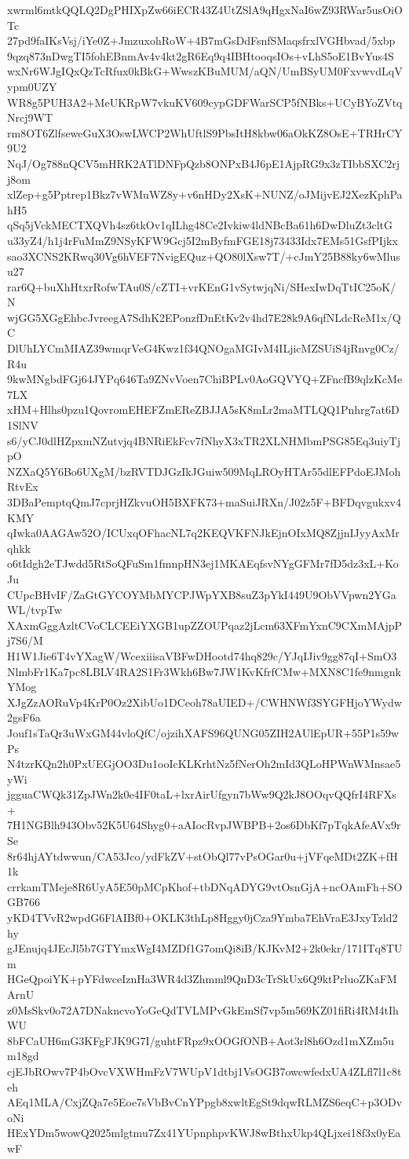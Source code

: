 xwrml6mtkQQLQ2DgPHIXpZw66iECR43Z4UtZSlA9qHgxNaI6wZ93RWar5usOiOTc
27pd9faIKsVsj/iYe0Z+JmzuxohRoW+4B7mGsDdFsnfSMaqsfrxlVGHbvad/5xbp
9qzq873nDwgTI5fohEBnmAv4v4kt2gR6Eq9q4IBHtooqsIOs+vLhS5oE1BvYus4S
wxNr6WJgIQxQzTcRfux0kBkG+WwszKBuMUM/aQN/UmBSyUM0FxvwvdLqVypm0UZY
WR8g5PUH3A2+MeUKRpW7vkuKV609cypGDFWarSCP5fNBks+UCyBYoZVtqNrcj9WT
rm8OT6ZlfseweGuX3OswLWCP2WhUftlS9PbsItH8kbw06aOkKZ8OsE+TRHrCY9U2
NqJ/Og788nQCV5mHRK2ATlDNFpQzb8ONPxB4J6pE1AjpRG9x3zTIbbSXC2rjj8om
xlZep+g5Pptrep1Bkz7vWMuWZ8y+v6nHDy2XsK+NUNZ/oJMijvEJ2XezKphPahH5
qSq5jVckMECTXQVh4sz6tkOv1qILhg48Ce2Ivkiw4ldNBcBa61h6DwDluZt3cltG
u33yZ4/h1j4rFuMmZ9NSyKFW9Gcj5I2mByfmFGE18j73433Idx7EMs51GsfPIjkx
sao3XCNS2KRwq30Vg6hVEF7NvigEQuz+QO80lXsw7T/+cJmY25B88ky6wMlusu27
rar6Q+buXhHtxrRofwTAu0S/cZTI+vrKEnG1vSytwjqNi/SHexIwDqTtIC25oK/N
wjGG5XGgEhbcJvreegA7SdhK2EPonzfDnEtKv2v4hd7E28k9A6qfNLdcReM1x/QC
DlUhLYCmMIAZ39wmqrVeG4Kwz1f34QNOgaMGIvM4ILjicMZSUiS4jRnvg0Cz/R4u
9kwMNgbdFGj64JYPq646Ta9ZNvVoen7ChiBPLv0AoGQVYQ+ZFncfB9qlzKcMe7LX
xHM+Hlhs0pzu1QovromEHEFZmEReZBJJA5sK8mLr2maMTLQQ1Pnhrg7at6D1SlNV
s6/yCJ0dlHZpxmNZutvjq4BNRiEkFcv7fNhyX3xTR2XLNHMbmPSG85Eq3uiyTjpO
NZXaQ5Y6Bo6UXgM/bzRVTDJGzIkJGuiw509MqLROyHTAr55dlEFPdoEJMohRtvEx
3DBaPemptqQmJ7cprjHZkvuOH5BXFK73+maSuiJRXn/J02z5F+BFDqvgukxv4KMY
qIwka0AAGAw52O/ICUxqOFhacNL7q2KEQVKFNJkEjnOIxMQ8ZjjnIJyyAxMrqhkk
o6tIdgh2eTJwdd5RtSoQFuSm1fmnpHN3ej1MKAEqfsvNYgGFMr7fD5dz3xL+KoJu
CUpcBHvIF/ZaGtGYCOYMbMYCPJWpYXB8suZ3pYkI449U9ObVVpwn2YGaWL/tvpTw
XAxmGggAzltCVoCLCEEiYXGB1upZZOUPqaz2jLcm63XFmYxnC9CXmMAjpPj7S6/M
H1W1Jie6T4vYXagW/WcexiiisaVBFwDHootd74hq829c/YJqIJiv9gg87qI+SmO3
NlmbFr1Ka7pc8LBLV4RA2S1Fr3Wkh6Bw7JW1KvKfrfCMw+MXN8C1fe9nmgnkYMog
XJgZzAORuVp4KrP0Oz2XibUo1DCeoh78aUIED+/CWHNWf3SYGFHjoYWydw2gsF6a
Jouf1sTaQr3uWxGM44vloQfC/ojzihXAFS96QUNG05ZIH2AUlEpUR+55P1s59wPs
N4tzrKQn2h0PxUEGjOO3Du1ooIcKLKrhtNz5fNerOh2mId3QLoHPWnWMnsae5yWi
jgguaCWQk31ZpJWn2k0e4IF0taL+lxrAirUfgyn7bWw9Q2kJ8OOqvQQfrI4RFXs+
7H1NGBlh943Obv52K5U64Shyg0+aAIocRvpJWBPB+2os6DbKf7pTqkAfeAVx9rSe
8r64hjAYtdwwun/CA53Jco/ydFkZV+stObQl77vPsOGar0u+jVFqeMDt2ZK+fH1k
crrkamTMeje8R6UyA5E50pMCpKhof+tbDNqADYG9vtOsnGjA+ncOAmFh+SOGB766
yKD4TVvR2wpdG6FlAIBf0+OKLK3thLp8Hggy0jCza9Ymba7EhVraE3JxyTzld2hy
gJEnujq4JEcJl5b7GTYmxWgI4MZDf1G7omQi8iB/KJKvM2+2k0ekr/171ITq8TUm
HGeQpoiYK+pYFdwceIznHa3WR4d3Zhmml9QnD3cTrSkUx6Q9ktPrluoZKaFMArnU
z0MsSkv0o72A7DNakncvoYoGeQdTVLMPvGkEmSf7vp5m569KZ01fiRi4RM4tIhWU
8bFCaUH6mG3KFgFJK9G7I/guhtFRpz9xOOGfONB+Aot3rl8h6Ozd1mXZm5um18gd
cjEJbROwv7P4bOvcVXWHmFzV7WUpV1dtbj1VsOGB7owcwfedxUA4ZLfl7l1c8teh
AEq1MLA/CxjZQa7e5Eoe7sVbBvCnYPpgb8xwltEgSt9dqwRLMZS6eqC+p3ODvoNi
HExYDm5wowQ2025mlgtmu7Zx41YUpnphpvKWJ8wBthxUkp4QLjxei18f3x0yEawF
